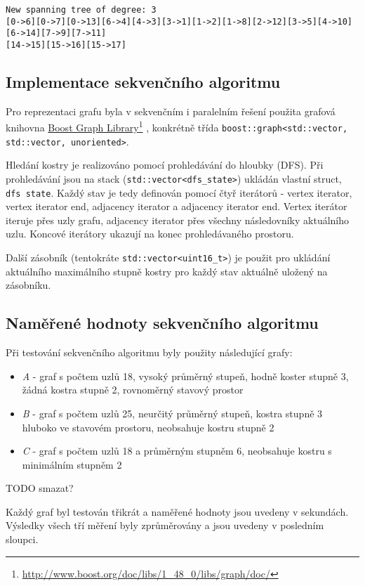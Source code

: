 \documentclass[]{article}
\newcommand\fnurl[2]{%
  \href{#2}{#1}\footnote{\url{#2}}%
}
\begin{document}
\begin{verbatim}
New spanning tree of degree: 3
[0->6][0->7][0->13][6->4][4->3][3->1][1->2][1->8][2->12][3->5][4->10][6->14][7->9][7->11]
[14->15][15->16][15->17]
\end{verbatim}

\subsection{Implementace sekvenčního algoritmu}
Pro reprezentaci grafu byla v sekvenčním i paralelním řešení použita grafová knihovna \fnurl{Boost Graph Library}{http://www.boost.org/doc/libs/1_48_0/libs/graph/doc/}, konkrétně třída \verb|boost::graph<std::vector, std::vector, unoriented>|.

Hledání kostry je realizováno pomocí prohledávání do hloubky (DFS). Při prohledávání jsou na stack (\verb|std::vector<dfs_state>|) ukládán vlastní struct, \verb|dfs state|. Každý stav je tedy definován pomocí čtyř iterátorů - vertex iterator, vertex iterator end, adjacency iterator a adjacency iterator end. Vertex iterátor iteruje přes uzly grafu, adjacency iterator přes všechny následovníky aktuálního uzlu. Koncové iterátory ukazují na konec prohledávaného prostoru.

Další zásobník (tentokráte \verb|std::vector<uint16_t>|) je použit pro ukládání aktuálního maximálního stupně kostry pro každý stav aktuálně uložený na zásobníku.

\subsection{Naměřené hodnoty sekvenčního algoritmu}
\label{grafy}
Při testování sekvenčního algoritmu byly použity následující grafy:

\begin{itemize}
  \item \textit{A} - graf s počtem uzlů 18, vysoký průměrný stupeň, hodně koster stupně 3, žádná kostra stupně 2, rovnoměrný stavový prostor
  \item \textit{B} - graf s počtem uzlů 25, neurčitý průměrný stupeň, kostra stupně 3 hluboko ve stavovém prostoru, neobsahuje kostru stupně 2
  \item \textit{C} - graf s počtem uzlů 18 a průměrným stupněm 6, neobsahuje kostru s minimálním stupněm 2
\end{itemize}

TODO smazat?

Každý graf byl testován třikrát a naměřené hodnoty jsou uvedeny v sekundách. Výsledky všech tří měření byly zprůměrovány a jsou uvedeny v posledním sloupci.
\end{document}
